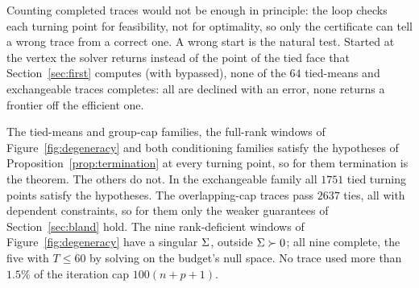 Counting completed traces would not be enough in principle: the loop checks each turning
point for feasibility, not for optimality, so only the certificate can tell a wrong
trace from a correct one. A wrong start is the natural test. Started at the vertex the
solver returns instead of the point of the tied face that Section~\ref{sec:first}
computes (with  bypassed), none of the $64$ tied-means and
exchangeable traces completes: all are declined with an error, none returns a frontier
off the efficient one.

The tied-means and group-cap families, the full-rank windows of
Figure~\ref{fig:degeneracy} and both conditioning families satisfy the hypotheses of
Proposition~\ref{prop:termination} at every turning point, so for them termination is
the theorem. The others do not. In the exchangeable family all $1751$ tied turning
points satisfy the hypotheses. The overlapping-cap traces pass $2637$ ties, all with
dependent constraints, so for them only the weaker guarantees of Section~\ref{sec:bland} hold.
The nine rank-deficient windows of Figure~\ref{fig:degeneracy} have a singular $\Sigma$,
outside $\Sigma\succ0$; all nine complete, the five with $T\le 60$ by solving on the
budget's null space. No trace used more than $1.5\%$ of the iteration cap
$100(n+p+1)$.
